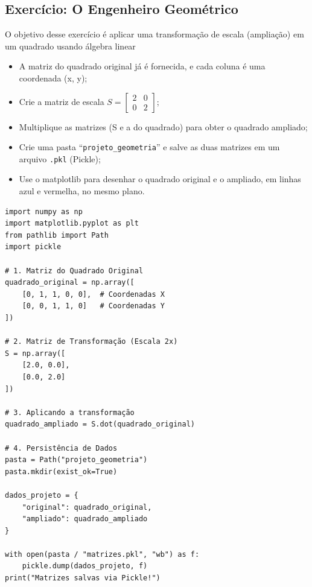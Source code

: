 \documentclass[../numerical_methods.tex]{subfiles}
\begin{document}
\subsection{Exercício: O Engenheiro Geométrico}
O objetivo desse exercício é aplicar uma transformação de escala (ampliação) em um quadrado usando álgebra linear
\begin{itemize}
	\item[1)] A matriz do quadrado original já é fornecida, e cada coluna é uma coordenada (x, y);
	\item[2)] Crie a matriz de escala \(S = \begin{bmatrix}
		      2 & 0 \\
		      0 & 2
	      \end{bmatrix}\);
	\item[3)] Multiplique as matrizes (S e a do quadrado) para obter o quadrado ampliado;
	\item[4)] Crie uma pasta ``\texttt{projeto\_geometria}'' e salve as duas matrizes em um arquivo \texttt{.pkl} (Pickle);
	\item[5)] Use o matplotlib para desenhar o quadrado original e o ampliado, em linhas azul e vermelha, no mesmo plano.
\end{itemize}

\begin{listing}[H]
	\begin{verbatim}
import numpy as np
import matplotlib.pyplot as plt
from pathlib import Path
import pickle

# 1. Matriz do Quadrado Original
quadrado_original = np.array([
    [0, 1, 1, 0, 0],  # Coordenadas X
    [0, 0, 1, 1, 0]   # Coordenadas Y
])

# 2. Matriz de Transformação (Escala 2x)
S = np.array([
    [2.0, 0.0],
    [0.0, 2.0]
])

# 3. Aplicando a transformação
quadrado_ampliado = S.dot(quadrado_original)

# 4. Persistência de Dados
pasta = Path("projeto_geometria")
pasta.mkdir(exist_ok=True)

dados_projeto = {
    "original": quadrado_original,
    "ampliado": quadrado_ampliado
}

with open(pasta / "matrizes.pkl", "wb") as f:
    pickle.dump(dados_projeto, f)
print("Matrizes salvas via Pickle!")
\end{verbatim}
\end{listing}
\end{document}
